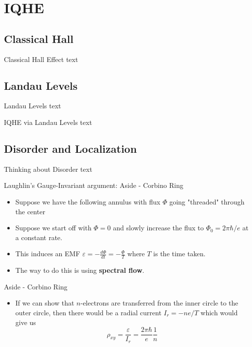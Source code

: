 \documentclass[12pt, aspectratio=169]{beamer}
\begin{document}
\section{IQHE}

\subsection{Classical Hall}
\begin{frame}{Classical Hall Effect}
    text
\end{frame}

\subsection{Landau Levels}
\begin{frame}{Landau Levels}
    text
\end{frame}

\begin{frame}{IQHE via Landau Levels}
    text
\end{frame}

\subsection{Disorder and Localization}
\begin{frame}{Thinking about Disorder}
    text
\end{frame}

\begin{frame}{Laughlin's Gauge-Invariant argument: Aside - Corbino Ring}
    \begin{itemize}
        \item <1->{Suppose we have the following annulus with flux $\Phi$ going "threaded" through the center}
        \item <2->{Suppose we start off with $\Phi = 0$ and slowly increase the flux to $\Phi_0 = 2\pi\hbar /e $ at a constant rate}. 
        \item <3->{This induces an EMF $\varepsilon = -\frac{d\Phi}{dt} = -\frac{\Phi}{T}$} where $T$ is the time taken. 
        \item <3->{The way to do this is using \textbf{spectral flow}.}
    \end{itemize}
\end{frame}


\begin{frame}{Aside - Corbino Ring}
    \begin{itemize}
        \item <1->{If we can show that $n$-electrons are transferred from the inner circle to the outer circle, then there would be a radial current $I_r = -ne/T$ which would give us $$\rho_{xy} = \frac{\varepsilon}{I_r} = \frac{2\pi\hbar}{e} \frac{1}{n}$$} 
    \end{itemize}
\end{frame}
\end{document}
